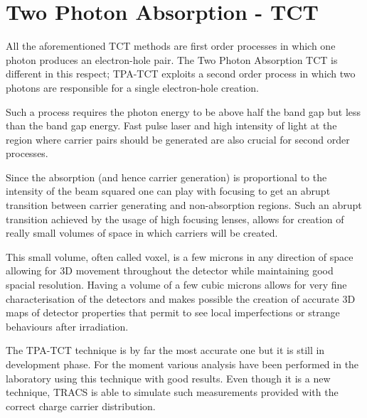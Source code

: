 \section{Two Photon Absorption - TCT} %

All the aforementioned TCT methods are first order processes in which one photon produces an electron-hole pair. The Two Photon Absorption TCT is different in this respect; TPA-TCT exploits a second order process in which two photons are responsible for a single electron-hole creation.


Such a process requires the photon energy to be above half the band gap but less than the band gap energy. Fast pulse laser and high intensity of light at the region where carrier pairs should be generated are also crucial for second order processes.

Since the absorption (and hence carrier generation) is proportional to the intensity of the beam squared one can play with focusing to get an abrupt transition between carrier generating and non-absorption regions. Such an abrupt transition achieved by the usage of high focusing lenses, allows for creation of really small volumes of space in which carriers will be created. 

 This small volume, often called voxel, is a few microns in any direction of space allowing for 3D movement throughout the detector while maintaining good spacial resolution. Having a volume of a few cubic microns allows for very fine characterisation of the detectors and makes possible the creation of accurate 3D maps of detector properties that permit to see local imperfections or strange behaviours after irradiation.

 The TPA-TCT technique is by far the most accurate one but it is still in development phase. For the moment various analysis have been performed in the laboratory using this technique with good results. Even though it is a new technique, TRACS is able to simulate such measurements provided with the correct charge carrier distribution.

